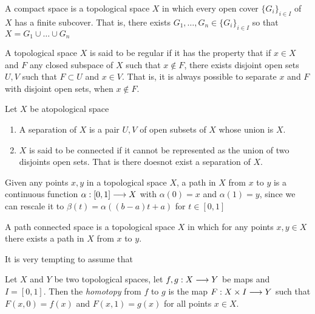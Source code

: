\begin{defn}
    A compact space is a topological space $X$ in which every open cover $\{G_i\}_{i \in I}$ of $X$ has a finite subcover. That is, there exists $G_1, \ldots, G_n \in \{G_i\}_{i \in I}$ so that $X  = G_1 \cup \ldots \cup G_n$ 
\end{defn}

\begin{defn}
    A topological space $X$ is said to be regular if it has the property that if $x \in X$ and $F$ any closed subspace of $X$ such that $x \notin F$, there exists disjoint open sets $U,V$ such that $F \subset U$ and $x \in V$. That is, it is always possible to separate $x$ and $F$ with disjoint open sets, when $x \notin F$.
\end{defn}

\begin{defn}
    Let $X$ be atopological space 
    \begin{enumerate}
        \item A separation of $X$ is a pair $U,V$ of open subsets of $X$ whose union is $X$.
        \item $X$ is said to be connected if it cannot be represented as the union of two disjoints open sets. That is there doesnot exist a separation of $X$.
    \end{enumerate}
\end{defn}

\begin{defn}[Path]
    Given any points $x,y$ in a topological space $X$, a path in $X$ from $x$ to $y$ is a continuous function $\alpha : [0,1] \longrightarrow X$ with $\alpha(0) = x$ and $\alpha(1) = y$, since we can rescale it to $\beta(t) = \alpha((b-a)t + a)$ for $t \in [0,1]$
\end{defn}
\begin{defn}
    A path connected space is a topological space $X$ in which for any points $x,y \in X$ there exists a path in $X$ from $x$ to $y$.
\end{defn}

It is very tempting to assume that 

\begin{defn}[Homotopy]
Let $X$ and $Y$ be two topological spaces, let $f,g : X \longrightarrow Y$ be maps and $I = [0,1]$. Then the \textit{homotopy} from $f$ to $g$ is the map $F: X \times I \longrightarrow Y$ such that $F(x,0) = f(x)$ and $F(x,1) = g(x)$ for all points $x \in X$.
\end{defn}

